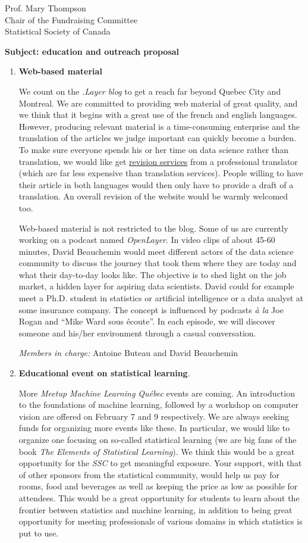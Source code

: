 \documentclass[11pt, a4paper]{letter} %
\begin{document}
\begin{letter}{
	Prof. Mary Thompson\\
	Chair of the Fundraising Committee\\
	Statistical Society of Canada
	
	\bigskip
	\textbf{Subject: education and outreach proposal}%
}
\begin{enumerate}
	\bigskip
	\emph{Member in charge:} Stéphane Caron\\
	
	\item \textbf{Web-based material}
	
	\quad We count on the \emph{.Layer blog} to get a reach far beyond Quebec City and Montreal. We are committed to providing web material of great quality, and we think that it begins with a great use of the french and english languages. However, producing relevant material is a time-consuming enterprise and the translation of the articles we judge important can quickly become a burden. To make sure everyone spends his or her time on data science rather than translation, we would like get \underline{revision services} from a professional translator (which are far less expensive than translation services). People willing to have their article in both languages would then only have to provide a draft of a translation. An overall revision of the website would be warmly welcomed too.
	
	\quad Web-based material is not restricted to the blog. Some of us are currently working on a podcast named \emph{OpenLayer}. In video clips of about 45-60 minutes, David Beauchemin would meet different actors of the data science community to discuss the journey that took them where they are today and what their day-to-day looks like. The objective is to shed light on the job market, a hidden layer for aspiring data scientists. David could for example meet a Ph.D. student in statistics or artificial intelligence or a data analyst at some insurance company. The concept is influenced by podcasts \emph{à la} Joe Rogan and ``Mike Ward sous écoute''. In each episode, we will discover someone and his/her environment through a casual conversation.
	
	\bigskip
	\emph{Members in charge:} Antoine Buteau and David Beauchemin\\
	
	\item \textbf{Educational event on statistical learning}.
	
	\quad More \emph{Meetup Machine Learning Québec} events are coming. An introduction to the foundations of machine learning, followed by a workshop on computer vision are offered on February 7 and 9 respectively. We are always seeking funds for organizing more events like these. In particular, we would like to organize one focusing on so-called statistical learning (we are big fans of the book \emph{The Elements of Statistical Learning}). We think this would be a great opportunity for the \emph{SSC} to get meaningful exposure. Your support, with that of other sponsors from the statistical community, would help us pay for rooms, food and beverages as well as keeping the price as low as possible for attendees. This would be a great opportunity for students to learn about the frontier between statistics and machine learning, in addition to being great opportunity for meeting professionals of various domains in which statistics is put to use.


\end{enumerate}
\end{letter}
\end{document}
